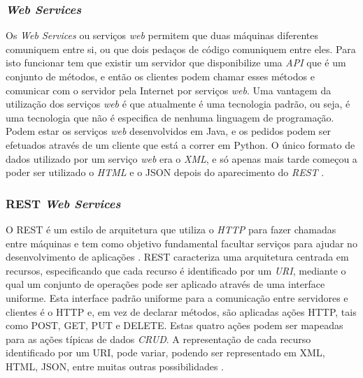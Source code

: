 \subsubsection{\textit{Web Services}}
Os \textit{Web Services} ou serviços \textit{web} permitem que duas máquinas diferentes comuniquem entre si, ou que dois pedaços de código comuniquem entre eles. Para isto funcionar tem que existir um servidor que disponibilize uma \textit{\gls{API}} que é um conjunto de métodos, e então os clientes podem chamar esses métodos e comunicar com o servidor pela Internet por serviços \textit{web}. Uma vantagem da utilização dos serviços \textit{web} é que atualmente é uma tecnologia padrão, ou seja, é uma tecnologia que não é especifica de nenhuma linguagem de programação. Podem estar os serviços \textit{web} desenvolvidos em Java, e os pedidos podem ser efetuados através de um cliente que está a correr em Python. O único formato de dados utilizado por um serviço \textit{web} era o \textit{\gls{XML}}, e só apenas mais tarde começou a poder ser utilizado o \textit{\gls{HTML}} e o \gls{JSON} depois do aparecimento do \textit{\gls{REST}} \cite{wsjakob}.



\subsubsection{ REST \textit{Web Services}}
O \gls{REST} é um estilo de arquitetura que utiliza o \textit{\gls{HTTP}} para fazer chamadas entre máquinas e tem como objetivo fundamental facultar serviços para ajudar no desenvolvimento de aplicações \cite{whatisrest}.
\gls{REST} caracteriza uma arquitetura centrada em recursos, especificando que cada recurso é identificado por um \textit{\gls{URI}}, mediante o qual um conjunto de operações pode ser aplicado através de uma interface uniforme. Esta interface padrão uniforme para a comunicação entre servidores e clientes é o \gls{HTTP} e, em vez de declarar métodos, são aplicadas ações \gls{HTTP}, tais como POST, GET, PUT e DELETE. Estas quatro ações podem ser mapeadas para as ações típicas de dados \textit{\gls{CRUD}}. A representação de cada recurso identificado por um URI, pode variar, podendo ser representado em \gls{XML}, \gls{HTML}, \gls{JSON}, entre muitas outras possibilidades \cite{restwebservices}.



